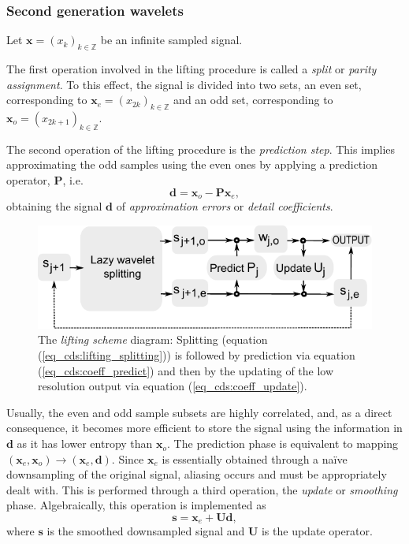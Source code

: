 \documentclass[graybox]{svmult}
\begin{document}
	\subsubsection{Second generation wavelets}
	Let $\mathbf{x} = (x_k)_{k\in \mathbb{Z}}$ be an infinite sampled signal.
	
	The first operation involved in the lifting procedure is called a \emph{split} or \emph{parity assignment}. To this effect, the signal is divided into two sets, an even set, corresponding to $\mathbf{x}_e = (x_{2k})_{k\in \mathbb{Z}}$ and an odd set, corresponding to $\mathbf{x}_o = (x_{2k+1})_{k\in\mathbb{Z}}$.
	
	The second operation of the lifting procedure is the \emph{prediction step}. This implies approximating the odd samples using the even ones by applying a prediction operator, $\mathbf{P}$, i.e.
	\begin{equation}
	\mathbf{d} = \mathbf{x}_o - \mathbf{P} \mathbf{x}_e,
	\end{equation}
	obtaining the signal $\mathbf{d}$ of \emph{approximation errors} or \emph{detail coefficients}.
	
	
	\begin{figure}[t]
		\centering
		\includegraphics[width=\textwidth]{lifting_diagram}
		\caption{The \emph{lifting scheme} diagram: Splitting (equation (\ref{eq_cds:lifting_splitting})) is followed by prediction via equation (\ref{eq_cds:coeff_predict}) and then by the updating of the low resolution output via equation (\ref{eq_cds:coeff_update}).}
		\label{fig_cds:lifting_diagram}
	\end{figure}
	
	
	Usually, the even and odd sample subsets are highly correlated, and, as a direct consequence, it becomes more efficient to store the signal using the information in $\mathbf{d}$ as it has lower entropy than $\mathbf{x}_o$. The prediction phase is equivalent to mapping $(\mathbf{x}_e, \mathbf{x}_o) \to (\mathbf{x}_e, \mathbf{d})$. Since $\mathbf{x}_e$ is essentially obtained through a na\"ive downsampling of the original signal, aliasing occurs and must be appropriately dealt with. This is performed through a third operation, the \emph{update} or \emph{smoothing} phase. Algebraically, this operation is implemented as
	\begin{equation}
	\mathbf{s} = \mathbf{x}_e + \mathbf{U}\mathbf{d},
	\end{equation}
	where $\mathbf{s}$ is the smoothed downsampled signal and $\mathbf{U}$ is the update operator. 
	
\end{document}
